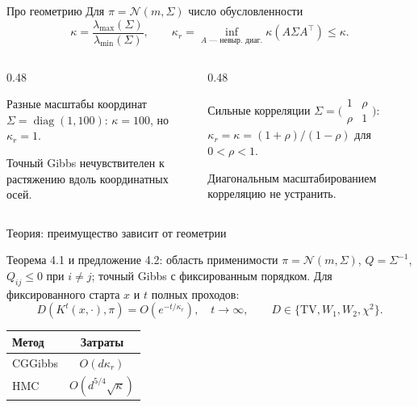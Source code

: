 \begin{frame}{Про геометрию}
  Для $\pi=\mathcal{N}(m,\Sigma)$ число обусловленности
  \[
    \kappa=\frac{\lambda_{\max}(\Sigma)}{\lambda_{\min}(\Sigma)},
    \qquad
    \kappa_r=\inf_{A\text{ --- невыр. диаг.}}
      \kappa(A\Sigma A^\top)\leq\kappa.
  \]
  \begin{columns}[T,onlytextwidth]
    \begin{column}{0.48\textwidth}
      \begin{block}{Разные масштабы координат}
        $\Sigma=\operatorname{diag}(1,100)$:
        $\kappa=100$, но $\kappa_r=1$.

        Точный Gibbs нечувствителен к растяжению вдоль координатных осей.
      \end{block}
    \end{column}
    \begin{column}{0.48\textwidth}
      \begin{block}{Сильные корреляции}
        $\Sigma=\bigl(\begin{smallmatrix}1&\rho\\\rho&1\end{smallmatrix}\bigr)$:
        $\kappa_r=\kappa=(1+\rho)/(1-\rho)$ для $0<\rho<1$.

        Диагональным масштабированием корреляцию не устранить.
      \end{block}
    \end{column}
  \end{columns}
\end{frame}

\begin{frame}{Теория: преимущество зависит от геометрии}
  \begin{block}{Теорема 4.1 и предложение 4.2: область применимости}
    $\pi=\mathcal{N}(m,\Sigma)$, $Q=\Sigma^{-1}$,
    $Q_{ij}\leq0$ при $i\ne j$; точный Gibbs с фиксированным порядком.
    Для фиксированного старта $x$ и $t$ полных проходов:
    \[
      D(K^t(x,\cdot),\pi)=O\!\left(e^{-t/\kappa_r}\right),\quad t\to\infty,
      \qquad D\in\{\mathrm{TV},W_1,W_2,\chi^2\}.
    \]
  \end{block}
  \begin{center}
    \begin{tabular}{lc}
      \toprule
      Метод & Затраты \\
      \midrule
      CGGibbs & $O(d\kappa_r)$ \\
      HMC & $O(d^{5/4}\sqrt{\kappa})$ \\
      \bottomrule
    \end{tabular}
  \end{center}
\end{frame}

